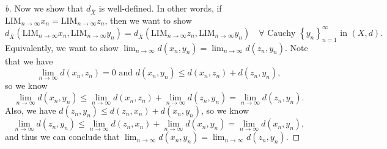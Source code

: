 \begin{proof}[b]
  Now we show that \(d_{\overline{X} }\) is well-defined. In other words, if \(\mathrm{LIM}_{n \to \infty } x_n = \mathrm{LIM}_{n \to \infty } z_n \), then we want to show
  \[
    d_{\overline{X} }\left( \mathrm{LIM}_{n \to \infty }x_n, \mathrm{LIM}_{n \to \infty }y_n   \right) = d_{\overline{X} } \left( \mathrm{LIM}_{n \to \infty }z_n, \mathrm{LIM}_{n \to \infty } y_n  \right) \quad \forall \text{ Cauchy } \left\{ y_n \right\}_{n=1}^{\infty} \text{ in } (X, d).   
  \]  Equivalently, we want to show \(\lim_{n \to \infty} d(x_n, y_n) = \lim_{n \to \infty} d(z_n, y_n) \). Note that we have 
  \[
     \lim_{n \to \infty} d(x_n, z_n) = 0 \text{ and } d(x_n, y_n) \le d(x_n, z_n) + d(z_n, y_n),
  \] so we know
  \[
    \lim_{n \to \infty} d(x_n, y_n) \le \lim_{n \to \infty} d(x_n, z_n) + \lim_{n \to \infty} d(z_n, y_n) = \lim_{n \to \infty} d(z_n, y_n).  
  \]
  Also, we have \(d(z_n, y_n) \le d(z_n, x_n) + d(x_n, y_n)\), so we know 
  \[
  \lim_{n \to \infty} d(z_n, y_n) \le \lim_{n \to \infty} d(z_n, x_n) + \lim_{n \to \infty} d(x_n, y_n) = \lim_{n \to \infty} d(x_n, y_n),
  \] and thus we can conclude that \(\lim_{n \to \infty} d(x_n, y_n) = \lim_{n \to \infty} d(z_n, y_n)  \). 
  

\end{proof}
